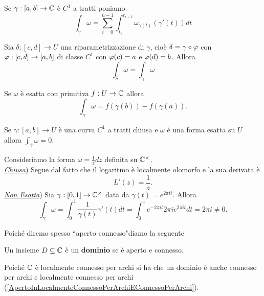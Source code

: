 \begin{multicols*}{2}
\begin{remark}
Se $\gamma:[a,b]\to \mathbb{C}$ \`e $C^1$ a tratti poniamo
\[\int_\gamma\omega=\sum_{i=0}^{n-1}\int_{t_i}^{t_{i+1}}\omega_{\gamma(t)}(\gamma'(t))dt\]
\end{remark}

\begin{proposition}\label{InvarianzaIntegralePerRiparametrizzazione}
Sia $\delta:[c,d]\to U$ una riparametrizzazione di $\gamma$, cio\`e $\delta=\gamma\circ \varphi$ con $\varphi:[c,d]\to [a,b]$ di classe $C^1$ con $\varphi(c)=a$ e $\varphi(d)=b$. Allora
\[\int_\delta\omega=\int_\gamma\omega\]
\end{proposition}
\begin{proposition}\label{IntegrazioneDi1formeEsatte}
Se $\omega$ \`e esatta con primitiva $f:U\to \mathbb{C}$ allora
\[\int_\gamma\omega=f(\gamma(b))-f(\gamma(a)).\]
\end{proposition}

\begin{corollary}
Se $\gamma:[a,b]\to U$ \`e una curva $C^1$ a tratti chiusa e $\omega$ \`e una forma esatta su $U$ allora $\int_\gamma\omega=0$.
\end{corollary}

\begin{example}
Consideriamo la forma $\omega=\frac1zdz$ definita su $\mathbb{C}^\times$.\\
\ul{\textit{Chiusa}}) Segue dal fatto che il logaritmo \`e localmente olomorfo e la sua derivata \`e \[L'(z)=\frac1z.\]
\ul{\textit{Non Esatta}}) Sia $\gamma:[0,1]\to \mathbb{C}^\times$ data da $\gamma(t)=e^{2\pi it}$. Allora
\[\int_\gamma\omega=\int_0^1\frac1{\gamma(t)}\gamma'(t)dt=\int_0^1e^{-2\pi it}2\pi ie^{2\pi it}dt=2\pi i\neq 0.\]
\end{example}

\noindent
Poich\'e diremo spesso ``aperto connesso"diamo la seguente
\begin{definition}[Dominio]
Un insieme $D\subseteq \mathbb{C}$ \`e un \textbf{dominio} se \`e aperto e connesso.
\end{definition}
\begin{remark}
Poich\'e $\mathbb{C}$ \`e localmente connesso per archi si ha che un dominio   \`e anche connesso per archi e localmente connesso per archi (\ref{ApertoInLocalmenteConnessoPerArchiEConnessoPerArchi}).
\end{remark}




\end{multicols*}
